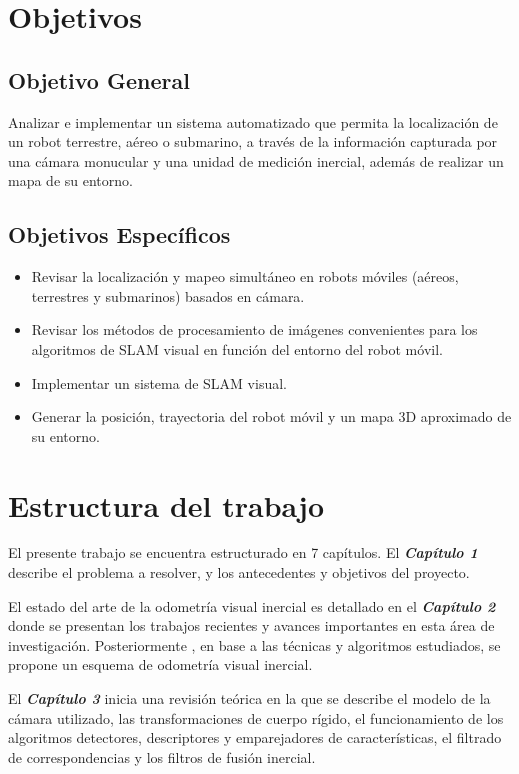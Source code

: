\section{Objetivos}

\subsection{Objetivo General}

Analizar e implementar un sistema automatizado que permita la localización de un robot terrestre, aéreo o submarino, a través de la información capturada por una cámara monucular y una unidad de medición inercial, además de realizar un mapa de su entorno.

\subsection{Objetivos Específicos}

\begin{itemize}
	\item  Revisar la localización y mapeo simultáneo en robots móviles (aéreos, terrestres y submarinos) basados en cámara.
	\item Revisar los métodos de procesamiento de imágenes convenientes para los algoritmos de SLAM visual en función del entorno del robot móvil.
	\item Implementar un sistema de SLAM visual.
	\item Generar la posición, trayectoria del robot móvil y  un mapa 3D aproximado de su entorno.
\end{itemize}

\section{Estructura del trabajo}

El presente trabajo se encuentra estructurado en 7 capítulos. El \textit{\textbf{Capítulo 1}} describe el problema a resolver, y los antecedentes y objetivos del proyecto.

El estado del arte de la odometría visual inercial es detallado en el \textit{\textbf{Capítulo 2}} donde se presentan los trabajos recientes y avances importantes en esta área de investigación. Posteriormente , en base a las técnicas y algoritmos estudiados, se propone un esquema de odometría visual inercial.


El \textit{\textbf{Capítulo 3}} inicia una revisión teórica en la que se describe el modelo de la cámara utilizado, las transformaciones de cuerpo rígido, 
el funcionamiento de los algoritmos detectores, descriptores y emparejadores de características, el filtrado de correspondencias y los filtros de fusión inercial.

